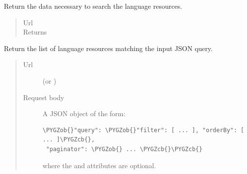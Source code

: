 \documentclass[letterpaper,10pt,english]{sphinxmanual}
\def\PYGZob{\char`\{}
\def\PYGZcb{\char`\}}
\begin{document}
\begin{fulllineitems}

\begin{fulllineitems}
\label{api:onlinelinguisticdatabase.controllers.languages.LanguagesController.new_search}
Return the data necessary to search the language resources.
\begin{quote}\begin{description}
\item[{Url }] \leavevmode
{}

\item[{Returns}] \leavevmode
{}

\end{description}\end{quote}

\end{fulllineitems}


\begin{fulllineitems}
\label{api:onlinelinguisticdatabase.controllers.languages.LanguagesController.search}
Return the list of language resources matching the input JSON query.
\begin{quote}\begin{description}
\item[{Url }] \leavevmode
{} (or )

\item[{Request body}] \leavevmode
A JSON object of the form:

\begin{Verbatim}[commandchars=\\\{\}]
\PYGZob{}"query": \PYGZob{}"filter": [ ... ], "orderBy": [ ... ]\PYGZcb{},
 "paginator": \PYGZob{} ... \PYGZcb{}\PYGZcb{}
\end{Verbatim}

where the  and  attributes are optional.

\end{description}\end{quote}

\end{fulllineitems}


\end{fulllineitems}
\end{document}
